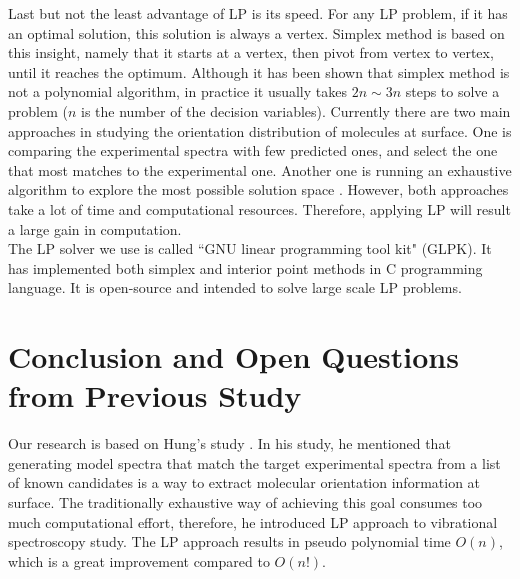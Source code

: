 Last but not the least advantage of LP is its speed. For any LP problem, if it has an optimal solution, this solution is always a vertex. Simplex method is based on this insight, namely that it starts at a vertex, then pivot from vertex to vertex, until it reaches the optimum. Although it has been shown that simplex method is not a polynomial algorithm, in practice it usually takes $2n\sim3n$ steps to solve a problem ($n$ is the number of the decision variables). Currently there are two main approaches in studying the orientation distribution of molecules at surface. One is comparing the experimental spectra with few predicted ones, and select the one that most matches to the experimental one. Another one is running an exhaustive algorithm to explore the most possible solution space \cite{hore0033-rotations}. However, both approaches take a lot of time and computational resources. Therefore, applying LP will result a large gain in computation.\\

The LP solver we use is called ``GNU linear programming tool kit" (GLPK). It has implemented both simplex and interior point methods in C programming language. It is open-source and intended to solve large scale LP problems. \\

\section{Conclusion and Open Questions from Previous Study}

Our research is based on Hung's study \cite{KuoKaiHung:Thesis:2015}. In his study, he mentioned that generating model spectra that match the target experimental spectra from a list of known candidates is a way to extract molecular orientation information at surface. The traditionally exhaustive way of achieving this goal consumes too much computational effort, therefore, he introduced LP approach to vibrational spectroscopy study. The LP approach results in pseudo polynomial time $O(n)$, which is a great improvement compared to $O(n!)$. \\

